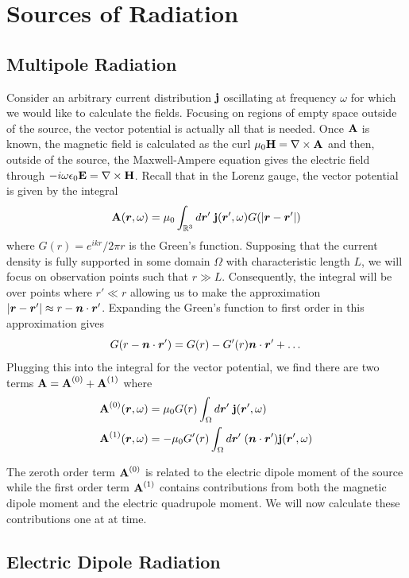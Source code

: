 \documentclass[twocolumn]{gwclass}
\newcommand{\R}{\mathbb{R}}
\newcommand{\bt}[1]{\text{\textbf{#1}}}
\begin{document}
	\section{Sources of Radiation}
	\subsection{Multipole Radiation}
	Consider an arbitrary current distribution $\bt{j}$ oscillating at frequency $\omega$ for which we would like to calculate the fields. Focusing on regions of empty space outside of the source, the vector potential is actually all that is needed. Once $\bt{A}$ is known, the magnetic field is calculated as the curl $\mu_0\bt{H}=\nabla\times\bt{A}$ and then, outside of the source, the Maxwell-Ampere equation gives the electric field through $-i\omega\epsilon_0\bt{E} = \nabla\times\bt{H}$. Recall that in the Lorenz gauge, the vector potential is given by the integral
	$$ \bt{A}(\*r,\omega) = \mu_0\int_{\R^3}d\*r'\;\bt{j}(\*r',\omega)G(|\*r - \*r'|) $$
	where $G(r)=e^{ikr}/2\pi r$ is the Green's function. Supposing that the current density is fully supported in some domain $\Omega$ with characteristic length $L$, we will focus on observation points such that $r\gg L$. Consequently, the integral will be over points where $r'\ll r$ allowing us to make the approximation $|\boldsymbol{r}-\boldsymbol{r}'| \approx r - \boldsymbol{n}\cdot\boldsymbol{r}'$. Expanding the Green's function to first order in this approximation gives
	$$ G(r - \boldsymbol{n}\cdot\boldsymbol{r}') = G(r) - G'(r)\boldsymbol{n}\cdot\boldsymbol{r}' + \dots $$
	Plugging this into the integral for the vector potential, we find there are two terms $\bt{A} = \bt{A}^{(0)} + \bt{A}^{(1)}$ where
	\begin{align*}
		\bt{A}^{(0)}(\*r,\omega) &= \mu_0G(r)\int_\Omega d\*r'\;\bt{j}(\*r',\omega)\\
 \bt{A}^{(1)}(\*r,\omega) &= - \mu_0G'(r)\int_\Omega d\*r'\;(\*n\cdot\*r')\bt{j}(\*r',\omega)
	\end{align*}

	The zeroth order term $\bt{A}^{(0)}$ is related to the electric dipole moment of the source while the first order term $\bt{A}^{(1)}$ contains contributions from both the magnetic dipole moment and the electric quadrupole moment. We will now calculate these contributions one at at time.
	
	\subsection{Electric Dipole Radiation}
\end{document}
